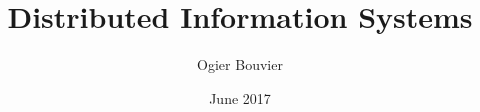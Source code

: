 \documentclass[10pt, landscape, a4paper]{article}
\author{Ogier Bouvier}
\date {June 2017}
\title{Distributed Information Systems}
\begin{document}
\raggedright
\footnotesize
\begin{multicols}{3}
  \setlength{\premulticols}{1pt}
  \setlength{\postmulticols}{1pt}
  \setlength{\multicolsep}{1pt}
  \setlength{\columnsep}{2pt}

  
  
  
  
  
  
  
  
  
  
  
  
  
  
\end{multicols}
\end{document}
